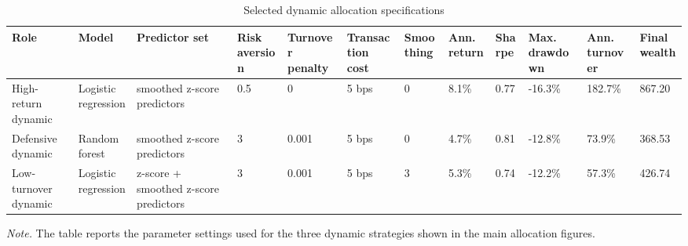 ﻿\begin{table}[!htbp]
\centering
\caption{Selected dynamic allocation specifications}
\label{tab:allocation-selected-strategies}
\small
\setlength{\tabcolsep}{5pt}
\renewcommand{\arraystretch}{1.18}
\begin{adjustbox}{max width=\linewidth}
\begin{tabular}{llllllllllll}
\toprule
Role & Model & Predictor set & Risk aversion & Turnover penalty & Transaction cost & Smoothing & Ann. return & Sharpe & Max. drawdown & Ann. turnover & Final wealth \\
\midrule
High-return dynamic & Logistic regression & smoothed z-score predictors & 0.5 & 0 & 5 bps & 0 & 8.1\% & 0.77 & -16.3\% & 182.7\% & 867.20 \\
Defensive dynamic & Random forest & smoothed z-score predictors & 3 & 0.001 & 5 bps & 0 & 4.7\% & 0.81 & -12.8\% & 73.9\% & 368.53 \\
Low-turnover dynamic & Logistic regression & z-score + smoothed z-score predictors & 3 & 0.001 & 5 bps & 3 & 5.3\% & 0.74 & -12.2\% & 57.3\% & 426.74 \\
\bottomrule
\end{tabular}
\end{adjustbox}
\vspace{0.65em}
\begin{minipage}{0.94\linewidth}
\footnotesize
\emph{Note.} The table reports the parameter settings used for the three dynamic strategies shown in the main allocation figures.
\end{minipage}
\end{table}

